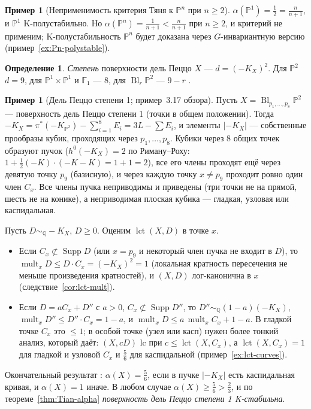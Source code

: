 \documentclass[11pt,a4paper]{article}
\theoremstyle{plain}
\theoremstyle{definition}
\newtheorem{definition}[theorem]{Определение}
\newtheorem{example}[theorem]{Пример}
\theoremstyle{remark}
\newcommand{\Q}{\mathbb{Q}}
\newcommand{\PP}{\mathbb{P}}
\DeclareMathOperator{\Bl}{Bl}
\DeclareMathOperator{\lct}{lct}
\DeclareMathOperator{\Supp}{Supp}
\DeclareMathOperator{\mult}{mult}
\begin{document}
\begin{example}[Неприменимость критерия Тяня к $\PP^n$ при $n\ge2$]
$\alpha(\PP^1)=\frac12=\frac n{n+1}$, и $\PP^1$ K-полустабильно. Но $\alpha(\PP^n)=\frac1{n+1}<\frac n{n+1}$
при $n\ge2$, и критерий не применим; K-полустабильность $\PP^n$ будет доказана через
$G$-инвариантную версию (пример~\ref{ex:Pn-polystable}).
\end{example}

\begin{definition}
\emph{Степень} поверхности дель Пеццо $X$ --- $d=(-K_X)^2$. Для $\PP^2$ $d=9$, для $\PP^1\times\PP^1$
и $\mathbb F_1$ --- $8$, для $\Bl_r\PP^2$ --- $9-r$ \cite[гл.~8]{Do}.
\end{definition}

\begin{example}[Дель Пеццо степени 1; пример~3.17 обзора]\label{ex:dP1-alpha}
Пусть $X=\Bl_{p_1,\dots,p_8}\PP^2$ --- поверхность дель Пеццо степени 1 (точки в общем положении).
Тогда $-K_X=\pi^*(-K_{\PP^2})-\sum_{i=1}^8E_i=3L-\sum E_i$, и элементы $|-K_X|$ --- собственные
прообразы кубик, проходящих через $p_1,\dots,p_8$. Кубики через 8 общих точек образуют пучок
($h^0(-K_X)=2$ по Риману--Роху: $1+\frac12(-K)\cdot(-K-K)=1+1=2$), все его члены проходят ещё через
девятую точку $p_9$ (базисную), и через каждую точку $x\ne p_9$ проходит ровно один член $C_x$.
Все члены пучка неприводимы и приведены (три точки не на прямой, шесть не на конике), а
неприводимая плоская кубика --- гладкая, узловая или каспидальная.

Пусть $D\sim_\Q-K_X$, $D\ge0$. Оценим $\lct(X,D)$ в точке $x$.
\begin{itemize}
\item Если $C_x\not\subset\Supp D$ (или $x=p_9$ и некоторый член пучка не входит в $D$), то
$\mult_xD\le D\cdot C_x=(-K_X)^2=1$ (локальная кратность пересечения не меньше произведения
кратностей), и $(X,D)$ лог-канонична в $x$ (следствие~\ref{cor:lct-mult}).
\item Если $D=aC_x+D''$ с $a>0$, $C_x\not\subset\Supp D''$, то $D''\sim_\Q(1-a)(-K_X)$,
$\mult_xD''\le D''\cdot C_x=1-a$, и $\mult_xD\le a\,\mult_xC_x+1-a$. В гладкой точке $C_x$ это
$\le1$; в особой точке (узел или касп) нужен более тонкий анализ, который даёт: $(X,cD)$ lc при
$c\le\lct(X,C_x)$, а $\lct(X,C_x)=1$ для гладкой и узловой $C_x$ и $\frac56$ для каспидальной
(пример~\ref{ex:lct-curves}).
\end{itemize}
Окончательный результат \cite[Thm~1.7]{Che08}: $\alpha(X)=\frac56$, если в пучке $|-K_X|$ есть каспидальная кривая, и
$\alpha(X)=1$ иначе. В любом случае $\alpha(X)\ge\frac56>\frac23$, и по теореме~\ref{thm:Tian-alpha}
\emph{поверхность дель Пеццо степени 1 K-стабильна}.
\end{example}
\end{document}
